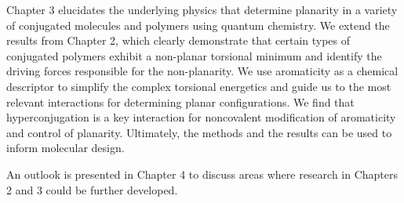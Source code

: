 Chapter 3 elucidates the underlying physics that determine planarity in a variety of conjugated molecules and polymers using quantum chemistry. We extend the results from Chapter 2, which clearly demonstrate that certain types of conjugated polymers exhibit a non-planar torsional minimum and identify the driving forces responsible for the non-planarity. We use aromaticity as a chemical descriptor to simplify the complex torsional energetics and guide us to the most relevant interactions for determining planar configurations. We find that hyperconjugation is a key interaction for noncovalent modification of aromaticity and control of planarity. Ultimately, the methods and the results can be used to inform molecular design.

An outlook is presented in Chapter 4 to discuss areas where research in Chapters 2 and 3 could be further developed.
